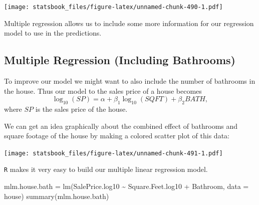 \documentclass[
]{book}
\newenvironment{Shaded}{\begin{snugshade}}{\end{snugshade}}
\newcommand{\AttributeTok}[1]{\textcolor[rgb]{0.77,0.63,0.00}{#1}}
\newcommand{\FloatTok}[1]{\textcolor[rgb]{0.00,0.00,0.81}{#1}}
\newcommand{\FunctionTok}[1]{\textcolor[rgb]{0.00,0.00,0.00}{#1}}
\newcommand{\NormalTok}[1]{#1}
\newcommand{\OtherTok}[1]{\textcolor[rgb]{0.56,0.35,0.01}{#1}}
\newcommand{\SpecialCharTok}[1]{\textcolor[rgb]{0.00,0.00,0.00}{#1}}
\newcommand{\StringTok}[1]{\textcolor[rgb]{0.31,0.60,0.02}{#1}}
\theoremstyle{definition}
\theoremstyle{definition}
\theoremstyle{definition}
\theoremstyle{definition}
\theoremstyle{remark}
\begin{document}
\texttt{[image: statsbook\_files/figure-latex/unnamed-chunk-490-1.pdf]}

Multiple regression allows us to include some more information for our regression model to use in the predictions.

\hypertarget{multiple-regression-including-bathrooms}{%
\subsection{Multiple Regression (Including Bathrooms)}\label{multiple-regression-including-bathrooms}}

To improve our model we might want to also include the number of bathrooms in the house. Thus our model to the sales price of a house becomes \[ \log_{10}(SP)=\alpha+\beta_1 \log_{10}(SQFT)+\beta_2 BATH, \] where \(SP\) is the sales price of the house.

We can get an idea graphically about the combined effect of bathrooms and square footage of the house by making a colored scatter plot of this data:

\begin{Shaded}
\end{Shaded}

\texttt{[image: statsbook\_files/figure-latex/unnamed-chunk-491-1.pdf]}

\texttt{R} makes it very easy to build our multiple linear regression model.

\begin{Shaded}
\begin{Highlighting}[]
\NormalTok{mlm.house.bath }\OtherTok{=} \FunctionTok{lm}\NormalTok{(SalePrice.log10 }\SpecialCharTok{\textasciitilde{}}\NormalTok{ Square.Feet.log10 }\SpecialCharTok{+}\NormalTok{ Bathroom, }\AttributeTok{data =}\NormalTok{ house)}
\FunctionTok{summary}\NormalTok{(mlm.house.bath)}
\end{Highlighting}
\end{Shaded}
\end{document}
